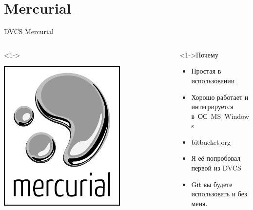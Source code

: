 \documentclass[pdf,9pt,aspectratio=169]{beamer}
\begin{document}
\section{Mercurial}

\begin{frame}{DVCS Mercurial}
  \begin{columns}[T]
    \begin{column}[]{0.35\textwidth}  
      \begin{exampleblock}<1->{}
        \begin{center}
          \includegraphics[width=0.7\textwidth]{images/Mercurial_logo.png}
        \end{center}
      \end{exampleblock}
    \end{column}
    \begin{column}[]{0.55\textwidth}  
      \begin{block}<1->{Почему}
        \begin{itemize}
          \item Простая в использовании
          \item Хорошо работает и интегрируется в\ ОС~MS~Windows
          \item bitbucket.org
          \item Я её попробовал первой из DVCS
          \item Git вы будете использовать и без меня.
        \end{itemize}
      \end{block}
    \end{column}
  \end{columns}
  \vfill
\end{frame}
\end{document}
